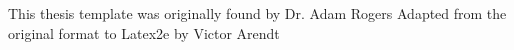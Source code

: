 

\clearpage
\begin{acknowledgement}
This thesis template was originally found by Dr. Adam Rogers
Adapted from the original format to Latex2e by Victor Arendt
\end{acknowledgement}
